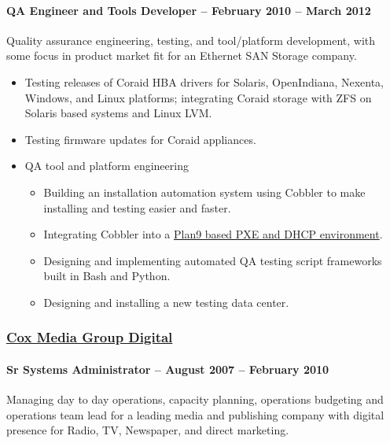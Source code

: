 \documentclass[fontsize=11pt]{scrartcl}
\begin{document}
\paragraph{QA Engineer and Tools Developer -- February 2010 -- March
2012}\label{qa-engineer-and-tools-developer-february-2010-march-2012}

Quality assurance engineering, testing, and tool/platform development,
with some focus in product market fit for an Ethernet SAN Storage
company.

\begin{itemize}
\item
  Testing releases of Coraid HBA drivers for Solaris, OpenIndiana,
  Nexenta, Windows, and Linux platforms; integrating Coraid storage with
  ZFS on Solaris based systems and Linux LVM.
\item
  Testing firmware updates for Coraid appliances.
\item
  QA tool and platform engineering

  \begin{itemize}
  \item
    Building an installation automation system using Cobbler to make
    installing and testing easier and faster.
  \item
    Integrating Cobbler into a
    \href{http://blog.friocorte.com/2011/05/chain-loading-pxe-servers.html}{Plan9
    based PXE and DHCP environment}.
  \item
    Designing and implementing automated QA testing script frameworks
    built in Bash and Python.
  \item
    Designing and installing a new testing data center.
  \end{itemize}
\end{itemize}

\subsubsection{\href{http://cmgdigital.com/}{Cox Media Group
Digital}}\label{cox-media-group-digital}

\paragraph{Sr Systems Administrator -- August 2007 -- February
2010}\label{sr-systems-administrator-august-2007-february-2010}

Managing day to day operations, capacity planning, operations budgeting
and operations team lead for a leading media and publishing company with
digital presence for Radio, TV, Newspaper, and direct marketing.
\end{document}
